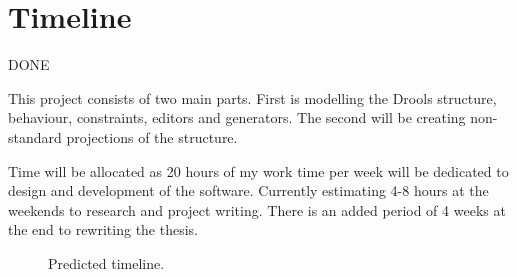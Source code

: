 \section{Timeline}
{\LARGE DONE}

This project consists of two main parts.
First is modelling the Drools structure, behaviour, constraints, editors and generators.
The second will be creating non-standard projections of the structure.

Time will be allocated as 20 hours of my work time per week will be dedicated to design and development of the software.
Currently estimating 4-8 hours at the weekends to research and project writing.
There is an added period of 4 weeks at the end to rewriting the thesis.

\begin{figure}[H]
    \centering
    \caption{Predicted timeline.}
    \label{fig:ganttchart}
\end{figure}
